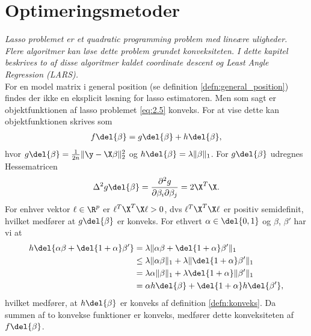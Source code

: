 \chapter{Optimeringsmetoder} \label{kap:optimeringsmetoder}
\textit{Lasso problemet er et quadratic programming problem med lineære uligheder. 
Flere algoritmer kan løse dette problem grundet konveksiteten.  
I dette kapitel beskrives to af disse algoritmer kaldet coordinate descent og Least Angle Regression (LARS).} \\[4mm]
%
For en model matrix i general position (se definition \ref{defn:general_position}) findes der ikke en eksplicit løsning for lasso estimatoren.
Men som sagt er objektfunktionen af lasso problemet \eqref{eq:2.5} konveks.
For at vise dette kan objektfunktionen skrives som
\begin{align}
f \del{\beta} = g \del{\beta} + h \del{\beta}, \label{eq:opdeling_fkt}
\end{align}
hvor \(g \del{\beta} = \frac{1}{2n} \Vert \y - \X \beta \Vert_2^2\) og \(h \del{\beta} = \lambda \Vert \beta \Vert_1\).
For \(g \del{\beta}\) udregnes Hessematricen
\begin{align*}
\Delta^2 g \del{\beta} = \frac{\partial^2 g }{\partial \beta_i \partial \beta_j} = 2 \X^T \X.
\end{align*}
For enhver vektor \(\ell \in \R^p\) er \(\ell^T \X^T \X \ell > 0\), dvs \(\ell^T \X^T \X \ell \) er positiv semidefinit, hvilket medfører at \(g \del{\beta}\) er konveks.
For ethvert \(\alpha \in \del{0,1}\) og \(\beta\), \(\beta'\) har vi at
\begin{align*}
h \del{\alpha \beta + \del{1+\alpha}\beta'} &= \lambda \Vert \alpha \beta + \del{1+\alpha} \beta' \Vert_1 \\
&\leq \lambda \Vert \alpha \beta \Vert_1 + \lambda \Vert \del{1+\alpha} \beta' \Vert_1 \\
&= \lambda \alpha \Vert \beta \Vert_1 + \lambda \del{1+\alpha} \Vert \beta' \Vert_1 \\
&= \alpha h \del{\beta} + \del{1+\alpha} h \del{\beta'},
\end{align*}
hvilket medfører, at \(h \del{\beta}\) er konveks af definition \ref{defn:konveks}.
Da summen af to konvekse funktioner er konveks, medfører dette konveksiteten af \(f \del{\beta}\). 

